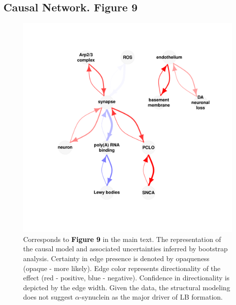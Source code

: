 \documentclass[11pt]{article}\usepackage[]{graphicx}\usepackage[usenames,dvipsnames]{color}
\newenvironment{knitrout}{}{} %
\begin{document}
\subsection{Causal Network. Figure 9}
\begin{figure}[h!]
\center
\begin{minipage}{0.95\textwidth}
\begin{knitrout}
\color{fgcolor}

{\centering \includegraphics[width=1\textwidth]{figure/visualization_path_causal_network-1} 

}



\end{knitrout}
\caption{Corresponds to \textcolor{black}{\colorbox{highlighter}{\textbf{Figure 9}}} in the main text.
The representation of the causal model and associated uncertainties inferred by
bootstrap analysis. Certainty in edge presence is denoted by opaqueness 
(opaque - more likely). Edge color represents directionality of the effect 
(red - positive, blue -  negative). Confidence in directionality is depicted by 
the edge width. Given the data, the structural modeling does not suggest 
$\alpha$-synuclein as the major driver of LB formation.}
\label{fig:CausalPathNetwork}
\end{minipage}
\end{figure}
\end{document}
